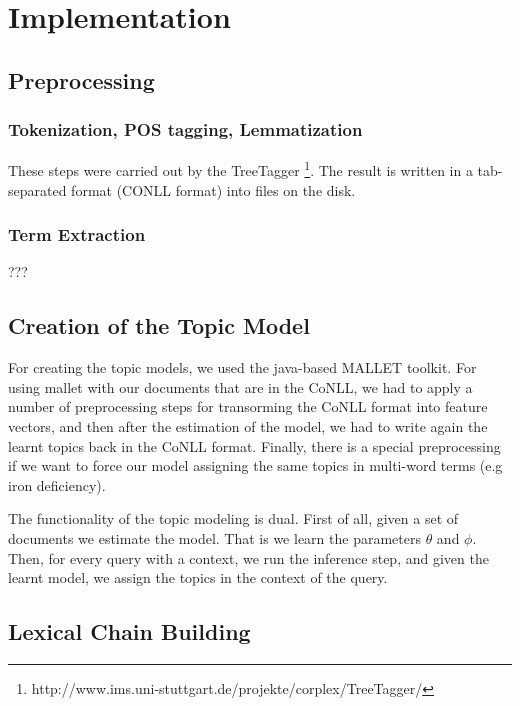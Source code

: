 \documentclass[11pt, a4paper, abstraction]{scrartcl}
\begin{document}
\section{Implementation}
\label{sec:implementation}

\subsection{Preprocessing}

\subsubsection{Tokenization, POS tagging, Lemmatization}
These steps were carried out by the TreeTagger \footnote{http://www.ims.uni-stuttgart.de/projekte/corplex/TreeTagger/}. The result is written in a tab-separated format (CONLL format) into files on the disk.

\subsubsection{Term Extraction}

???

\subsection{Creation of the Topic Model}

For creating the topic models, we used the java-based MALLET toolkit. For using mallet with our documents that are in the CoNLL, we had to apply a number of preprocessing steps for transorming the CoNLL format into feature vectors, and then after the estimation of the model, we had to write again the learnt topics back in the CoNLL format. Finally, there is a special preprocessing if we want to force our model assigning the same topics in multi-word terms (e.g iron deficiency).

The functionality of the topic modeling is dual. First of all, given a set of documents we estimate the model. That is we  learn the parameters $\theta$ and $\phi$. Then, for every query with a context, we run the inference step, and given the learnt model, we assign the topics in the context of the query. 

\subsection{Lexical Chain Building}
\end{document}
